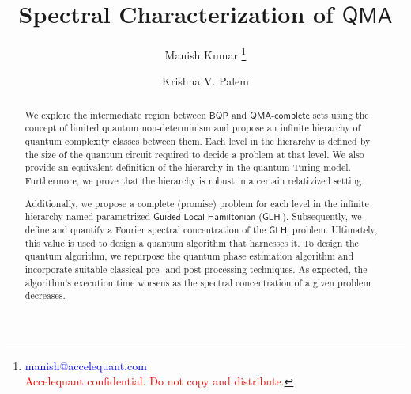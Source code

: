 \documentclass[11pt]{article}
\title{Spectral Characterization of $\mathsf{QMA}$  }
\author[1]{Manish Kumar \footnote{\textcolor{blue}{manish@accelequant.com}\\ \textcolor{red}{Accelequant confidential. Do not copy and distribute.}}}
\author[1]{Krishna V. Palem}
\affil[1]{Accelequant Inc.}
\newcommand{\ms}[1]{\mathsf{#1}}
\begin{document}
\maketitle
\begin{abstract}
    We explore the intermediate region between $\mathsf{BQP}$ and $\mathsf{QMA}$-$\mathsf{complete}$ sets using the concept of limited quantum non-determinism and propose an infinite hierarchy of quantum complexity classes between them. Each level in the hierarchy is defined by the size of the quantum circuit required to decide a problem at that level. We also provide an equivalent definition of the hierarchy in the quantum Turing model. Furthermore, we prove that the hierarchy is robust in a certain relativized setting.\par
    Additionally, we propose a complete (promise) problem for each level in the infinite hierarchy named parametrized $\mathsf{Guided}$ $\mathsf{Local}$ $\mathsf{Hamiltonian}$ ($\ms{GLH_i}$). Subsequently, we define and quantify a Fourier spectral concentration of the $\ms{GLH_i}$ problem. Ultimately, this value is used to design a quantum algorithm that harnesses it. To design the quantum algorithm, we repurpose the quantum phase estimation algorithm and incorporate suitable classical pre- and post-processing techniques. As expected, the algorithm's execution time worsens as the spectral concentration of a given problem decreases.\par
\end{abstract}
\newpage

\tableofcontents

\newpage
\end{document}
